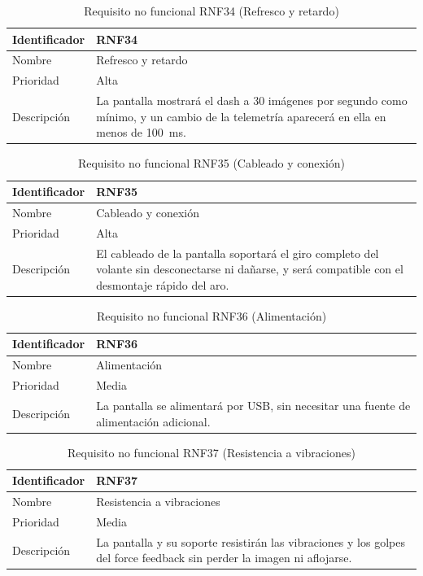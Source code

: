 \begin{table}[H]
	\centering
	\renewcommand{\arraystretch}{2}
	\begin{tabular}{|l|p{10cm}|}
		\hline
		Identificador & RNF34 \\
		\hline
		Nombre & Refresco y retardo \\
		\hline
		Prioridad & Alta \\
		\hline
		Descripción & La pantalla mostrará el dash a 30 imágenes por segundo como mínimo, y un cambio de la telemetría aparecerá en ella en menos de 100~ms. \\
		\hline
	\end{tabular}
	\caption{Requisito no funcional RNF34 (Refresco y retardo)}
	\label{tab:rnf34}
\end{table}

\begin{table}[H]
	\centering
	\renewcommand{\arraystretch}{2}
	\begin{tabular}{|l|p{10cm}|}
		\hline
		Identificador & RNF35 \\
		\hline
		Nombre & Cableado y conexión \\
		\hline
		Prioridad & Alta \\
		\hline
		Descripción & El cableado de la pantalla soportará el giro completo del volante sin desconectarse ni dañarse, y será compatible con el desmontaje rápido del aro. \\
		\hline
	\end{tabular}
	\caption{Requisito no funcional RNF35 (Cableado y conexión)}
	\label{tab:rnf35}
\end{table}

\begin{table}[H]
	\centering
	\renewcommand{\arraystretch}{2}
	\begin{tabular}{|l|p{10cm}|}
		\hline
		Identificador & RNF36 \\
		\hline
		Nombre & Alimentación \\
		\hline
		Prioridad & Media \\
		\hline
		Descripción & La pantalla se alimentará por USB, sin necesitar una fuente de alimentación adicional. \\
		\hline
	\end{tabular}
	\caption{Requisito no funcional RNF36 (Alimentación)}
	\label{tab:rnf36}
\end{table}

\begin{table}[H]
	\centering
	\renewcommand{\arraystretch}{2}
	\begin{tabular}{|l|p{10cm}|}
		\hline
		Identificador & RNF37 \\
		\hline
		Nombre & Resistencia a vibraciones \\
		\hline
		Prioridad & Media \\
		\hline
		Descripción & La pantalla y su soporte resistirán las vibraciones y los golpes del force feedback sin perder la imagen ni aflojarse. \\
		\hline
	\end{tabular}
	\caption{Requisito no funcional RNF37 (Resistencia a vibraciones)}
	\label{tab:rnf37}
\end{table}

